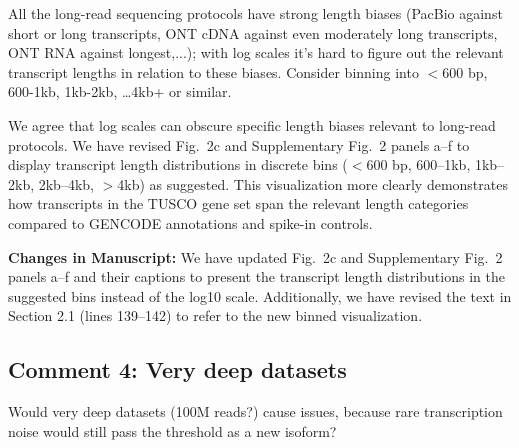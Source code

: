 \documentclass[11pt]{article}
\begin{document}
\begin{reviewercomment}
All the long-read sequencing protocols have strong length biases (PacBio against short or long transcripts, ONT cDNA against even moderately long transcripts, ONT RNA against longest,...); with log scales it's hard to figure out the relevant transcript lengths in relation to these biases. Consider binning into $<$600 bp, 600-1kb, 1kb-2kb, \ldots 4kb+ or similar.
\end{reviewercomment}

\begin{responseboxnew}
We agree that log scales can obscure specific length biases relevant to long-read protocols. We have revised Fig.~2c and Supplementary Fig.~2 panels a--f to display transcript length distributions in discrete bins ($<$600 bp, 600--1kb, 1kb--2kb, 2kb--4kb, $>$4kb) as suggested. This visualization more clearly demonstrates how transcripts in the TUSCO gene set span the relevant length categories compared to GENCODE annotations and spike-in controls.

\vspace{0.3cm}
\textbf{Changes in Manuscript:} We have updated Fig.~2c and Supplementary Fig.~2 panels a--f and their captions to present the transcript length distributions in the suggested bins instead of the log10 scale. Additionally, we have revised the text in Section 2.1 (lines 139--142) to refer to the new binned visualization.
\end{responseboxnew}

\subsection{Comment 4: Very deep datasets}

\begin{reviewercomment}
Would very deep datasets (100M reads?) cause issues, because rare transcription noise would still pass the threshold as a new isoform?
\end{reviewercomment}
\end{document}
